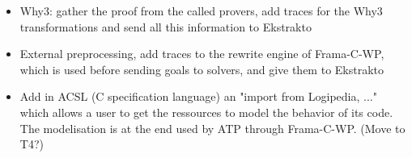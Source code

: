 \begin{workpackage}
\begin{tasklist}
\begin{task}[id=cooperation, title=Make ATPs cooperate]
\begin{itemize}
\item Why3: gather the proof from the called provers, add traces for the
  Why3 transformations and send all this information to Ekstrakto
\item External preprocessing, add traces to the rewrite engine of
  Frama-C-WP, which is used before sending goals to solvers, and give
  them to Ekstrakto
\item Add in ACSL (C specification language) an "import from Logipedia,
  ..." which allows a user to get the ressources to model the behavior
  of its code. The modelisation is at the end used by ATP through
  Frama-C-WP. (Move to T4?)
\end{itemize}

\end{task}
\end{tasklist}







\end{workpackage}
